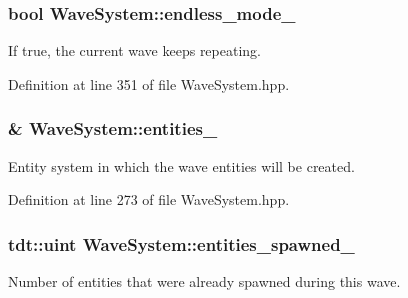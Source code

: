 \subsubsection[{\texorpdfstring{endless\+\_\+mode\+\_\+}{endless_mode_}}]{\setlength{\rightskip}{0pt plus 5cm}bool Wave\+System\+::endless\+\_\+mode\+\_\+\hspace{0.3cm}{\ttfamily [private]}}\hypertarget{class_wave_system_a9d79eb962ae15b6b77517f5f9a4b16a6}{}\label{class_wave_system_a9d79eb962ae15b6b77517f5f9a4b16a6}


If true, the current wave keeps repeating. 



Definition at line 351 of file Wave\+System.\+hpp.

\subsubsection[{\texorpdfstring{entities\+\_\+}{entities_}}]{\& Wave\+System\+::entities\+\_\+\hspace{0.3cm}{\ttfamily [private]}}\hypertarget{class_wave_system_a8f590c5b9cf0cd5f7fdc5afee19dd389}{}\label{class_wave_system_a8f590c5b9cf0cd5f7fdc5afee19dd389}


Entity system in which the wave entities will be created. 



Definition at line 273 of file Wave\+System.\+hpp.

\subsubsection[{\texorpdfstring{entities\+\_\+spawned\+\_\+}{entities_spawned_}}]{\setlength{\rightskip}{0pt plus 5cm}tdt\+::uint Wave\+System\+::entities\+\_\+spawned\+\_\+\hspace{0.3cm}{\ttfamily [private]}}\hypertarget{class_wave_system_ab25df374df710d5fca47d39a39859f66}{}\label{class_wave_system_ab25df374df710d5fca47d39a39859f66}


Number of entities that were already spawned during this wave. 



